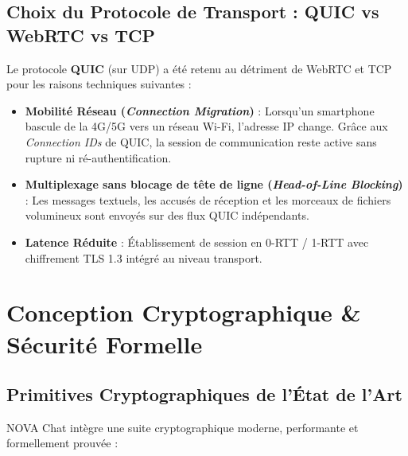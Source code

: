 \documentclass[11pt,a4paper]{article}
\begin{document}
\subsection{Choix du Protocole de Transport : QUIC vs WebRTC vs TCP}
Le protocole \textbf{QUIC} (sur UDP) a été retenu au détriment de WebRTC et TCP pour les raisons techniques suivantes :
\begin{itemize}
    \item \textbf{Mobilité Réseau (\textit{Connection Migration})} : Lorsqu'un smartphone bascule de la 4G/5G vers un réseau Wi-Fi, l'adresse IP change. Grâce aux \textit{Connection IDs} de QUIC, la session de communication reste active sans rupture ni ré-authentification.
    \item \textbf{Multiplexage sans blocage de tête de ligne (\textit{Head-of-Line Blocking})} : Les messages textuels, les accusés de réception et les morceaux de fichiers volumineux sont envoyés sur des flux QUIC indépendants.
    \item \textbf{Latence Réduite} : Établissement de session en 0-RTT / 1-RTT avec chiffrement TLS 1.3 intégré au niveau transport.
\end{itemize}

\vspace{0.3cm}

\section{Conception Cryptographique \& Sécurité Formelle}

\subsection{Primitives Cryptographiques de l'État de l'Art}
NOVA Chat intègre une suite cryptographique moderne, performante et formellement prouvée :
\end{document}
